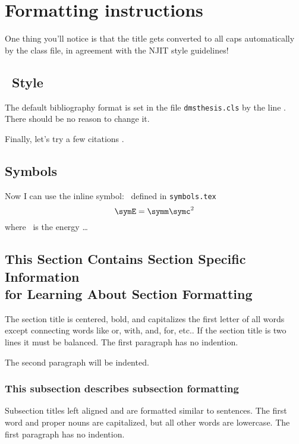\chapter{Formatting instructions}
\label{ch:formatting}

One thing you'll notice is that the title gets converted to all caps automatically by the class file, in agreement with the NJIT style guidelines!

\section{\BibTeX\ Style}

The default bibliography format is set in the file \texttt{dmsthesis.cls} by the line \verb++. There should be no reason to change it.

Finally, let's try a few citations \cite{ALBERTSETAL:1994,FERSHT:1985,FISCHER:1987a,KAUFFMAN:1969,MR1191182,MR1617060}. 

\section{Symbols}
\opensymdef
{}
\closesymdef

Now I can use the inline symbol: \symE\ defined in \texttt{symbols.tex} \[\symE=\symm \symc^2\] where
\symE\ is the energy \ldots

\section{This Section Contains Section Specific Information\\ for Learning About Section Formatting}
The section title is centered, bold, and capitalizes the first letter of all words except connecting words like or, with, and, for, etc.. If the section title is two lines it must be balanced. The first paragraph has no indention.

The second paragraph will be indented.

\subsection{This subsection describes subsection formatting}
Subsection titles left aligned and are formatted similar to sentences. The first word and proper nouns are capitalized, but all other words are lowercase. The first paragraph has no indention.

